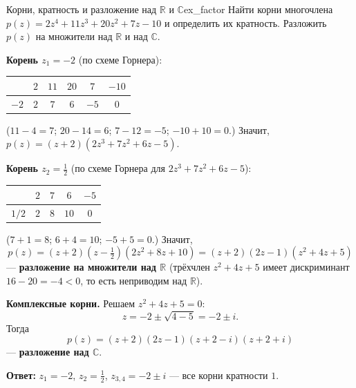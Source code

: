 \documentclass[12pt,a4paper]{article}
\begin{document}
\begin{definition}{Корни, кратность и разложение над $\mathbb{R}$ и
$\mathbb{C}$}{ex_factor}
Найти корни многочлена
$p(z) = 2z^4 + 11z^3 + 20z^2 + 7z - 10$ и определить их кратность.
Разложить $p(z)$ на множители над $\mathbb{R}$ и над $\mathbb{C}$.

\medskip
\textbf{Корень $z_1 = -2$} (по схеме Горнера):
\begin{center}
\renewcommand{\arraystretch}{1.3}
\begin{tabular}{c|ccccc}
  & $2$ & $11$ & $20$ & $7$ & $-10$ \\
  \hline
  $-2$ & $2$ & $7$ & $6$ & $-5$ & $0$ \\
\end{tabular}
\end{center}
($11 - 4 = 7$; $20 - 14 = 6$; $7 - 12 = -5$; $-10 + 10 = 0$.)
Значит, $p(z) = (z + 2)(2z^3 + 7z^2 + 6z - 5)$.

\textbf{Корень $z_2 = \frac{1}{2}$} (по схеме Горнера для
$2z^3 + 7z^2 + 6z - 5$):
\begin{center}
\renewcommand{\arraystretch}{1.3}
\begin{tabular}{c|cccc}
  & $2$ & $7$ & $6$ & $-5$ \\
  \hline
  $1/2$ & $2$ & $8$ & $10$ & $0$ \\
\end{tabular}
\end{center}
($7 + 1 = 8$; $6 + 4 = 10$; $-5 + 5 = 0$.) Значит,
\[
p(z) = (z + 2)\left(z - \tfrac{1}{2}\right)(2z^2 + 8z + 10)
= (z + 2)(2z - 1)(z^2 + 4z + 5)
\]
— \textbf{разложение на множители над $\mathbb{R}$} (трёхчлен
$z^2 + 4z + 5$ имеет дискриминант $16 - 20 = -4 < 0$, то есть
неприводим над $\mathbb{R}$).

\textbf{Комплексные корни.} Решаем $z^2 + 4z + 5 = 0$:
\[
z = -2 \pm \sqrt{4 - 5} = -2 \pm i.
\]
Тогда
\[
p(z) = (z + 2)(2z - 1)(z + 2 - i)(z + 2 + i)
\]
— \textbf{разложение над $\mathbb{C}$}.

\textbf{Ответ:} $z_1 = -2$, $z_2 = \tfrac{1}{2}$,
$z_{3,4} = -2 \pm i$ — все корни кратности $1$.
\end{definition}
\end{document}
